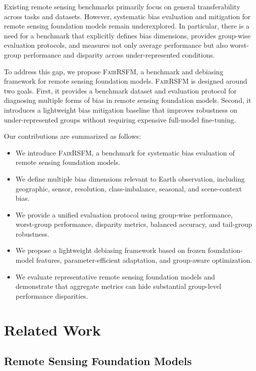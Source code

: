 \documentclass[10pt,twocolumn,letterpaper]{article}
\newcommand{\method}{\textsc{FairRSFM}\xspace}
\begin{document}
Existing remote sensing benchmarks primarily focus on general transferability across tasks and datasets. However, systematic bias evaluation and mitigation for remote sensing foundation models remain underexplored. In particular, there is a need for a benchmark that explicitly defines bias dimensions, provides group-wise evaluation protocols, and measures not only average performance but also worst-group performance and disparity across under-represented conditions.

To address this gap, we propose \method, a benchmark and debiasing framework for remote sensing foundation models. \method is designed around two goals. First, it provides a benchmark dataset and evaluation protocol for diagnosing multiple forms of bias in remote sensing foundation models. Second, it introduces a lightweight bias mitigation baseline that improves robustness on under-represented groups without requiring expensive full-model fine-tuning.

Our contributions are summarized as follows:
\begin{itemize}[leftmargin=*]
    \item We introduce \method, a benchmark for systematic bias evaluation of remote sensing foundation models.
    \item We define multiple bias dimensions relevant to Earth observation, including geographic, sensor, resolution, class-imbalance, seasonal, and scene-context bias.
    \item We provide a unified evaluation protocol using group-wise performance, worst-group performance, disparity metrics, balanced accuracy, and tail-group robustness.
    \item We propose a lightweight debiasing framework based on frozen foundation-model features, parameter-efficient adaptation, and group-aware optimization.
    \item We evaluate representative remote sensing foundation models and demonstrate that aggregate metrics can hide substantial group-level performance disparities.
\end{itemize}

\section{Related Work}

\subsection{Remote Sensing Foundation Models}
\end{document}
